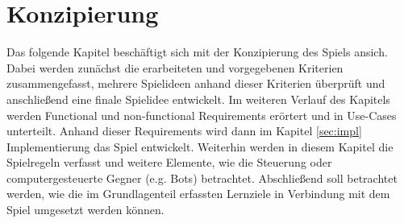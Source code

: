 \section{Konzipierung}
Das folgende Kapitel beschäftigt sich mit der Konzipierung des Spiels ansich. Dabei werden zunächst die erarbeiteten und vorgegebenen Kriterien zusammengefasst, mehrere Spielideen anhand dieser Kriterien überprüft und anschließend eine finale Spielidee entwickelt. Im weiteren Verlauf des Kapitels werden Functional und non-functional Requirements erörtert und in Use-Cases unterteilt. Anhand dieser Requirements wird dann im Kapitel \ref{sec:impl} Implementierung das Spiel entwickelt. Weiterhin werden in diesem Kapitel die Spielregeln verfasst und weitere Elemente, wie die Steuerung oder computergesteuerte Gegner (e.g. Bots) betrachtet. Abschließend soll betrachtet werden, wie die im Grundlagenteil erfassten Lernziele in Verbindung mit dem Spiel umgesetzt werden können.
